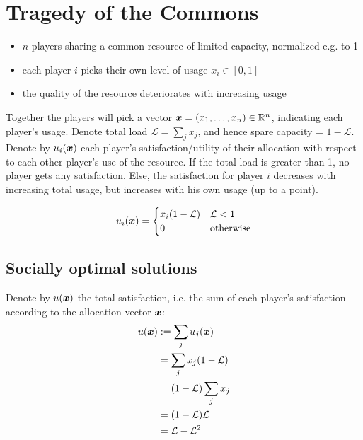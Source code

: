 \section{Tragedy of the Commons}
	\begin{itemize}
		\itemsep0em
		\item $n$ players sharing a common resource of limited capacity, normalized e.g. to 1
		\item each player $i$ picks their own level of usage $x_i \in [0,1]$
		\item the quality of the resource deteriorates with increasing usage
	\end{itemize}

	Together the players will pick a vector $\bm{x} = (x_1, \ldots, x_n)
	\in \mathbb{R}^n$, indicating each player's usage.
	Denote total load $\mathcal{L} = \sum_j x_j$, and hence spare capacity = $1
	- \mathcal{L}$. \\

	Denote by $u_i(\bm{x})$ each player's satisfaction/utility of
	their allocation with respect to each other player's use of the resource.
	If the total load is greater than 1, no player gets any satisfaction. Else,
	the satisfaction for player $i$ decreases with increasing total usage, but
	increases with his own usage (up to a point).

	\begin{equation}
		u_i(\bm{x}) = 
		\begin{cases}
			x_i (1 - \mathcal{L}) & \mathcal{L} < 1 \\
			0 & \text{otherwise}
		\end{cases}
	\end{equation}

\subsection{Socially optimal solutions}
	Denote by $u(\bm{x})$ the total satisfaction, i.e. the sum of
	each player's satisfaction according to the allocation vector $\bm{x}$:
	\begin{equation}
		\begin{split}
			u(\bm{x}) & := \sum_j u_j(\bm{x}) \\
				& = \sum_j x_j (1 - \mathcal{L}) \\
				& = (1 - \mathcal{L}) \sum_j x_j \\
				& = (1 - \mathcal{L}) \mathcal{L} \\
				& = \mathcal{L} - \mathcal{L}^2
			\end{split}
			\end{equation}

